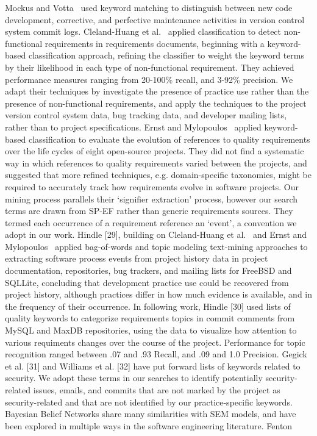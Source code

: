 Mockus and Votta~\cite{mockus2000identifying} used keyword matching to distinguish between new code development, corrective, and perfective maintenance activities in version control system commit logs.
Cleland-Huang et al.~\cite{clelandhuang2006detection} applied classification to detect non-functional requirements in requirements documents, beginning with a keyword-based classification approach, refining the classifier to weight the keyword terms by their likelihood in each type of non-functional requirement. They achieved performance measures ranging from 20-100\% recall, and 3-92\% precision. We adapt their techniques by investigate the presence of practice use rather than the presence of non-functional requirements, and apply the techniques to the project version control system data, bug tracking data, and developer mailing lists, rather than to project specifications.
Ernst and Mylopoulos~\cite{ernst10refsq} applied keyword-based classification to evaluate the evolution of references to quality requirements over the life cycles of eight open-source projects. They did not find a systematic way in which references to quality requirements varied between the projects, and suggested that more refined techniques, e.g. domain-specific taxonomies, might be required to accurately track how requirements evolve in software projects. Our mining process parallels their `signifier extraction' process, however our search terms are drawn from SP-EF rather than generic requirements sources. They termed each occurrence of a requirement reference an `event', a convention we adopt in our work.
Hindle [29], building on Cleland-Huang et al.~\cite{clelandhuang2006detection} and Ernst and Mylopoulos~\cite{ernst10refsq} applied bag-of-words and topic modeling text-mining approaches to extracting software process events from project history data in project documentation, repositories, bug trackers, and mailing lists for FreeBSD and SQLLite, concluding that development practice use could be recovered from project history, although practices differ in how much evidence is available, and in the frequency of their occurrence. In following work, Hindle [30] used lists of quality keywords to categorize requirements topics in commit comments from MySQL and MaxDB repositories, using the data to visualize how attention to various requiments changes over the course of the project. Performance for topic recognition ranged between .07 and .93 Recall, and .09 and 1.0 Precision. 
Gegick et al. [31] and Williams et al. [32] have put forward lists of keywords related to security. We adopt these terms in our searches to identify potentially security-related issues, emails, and commits that are not marked by the project as security-related and that are not identified by our practice-specific keywords.
Bayesian Belief Networks share many similarities with SEM models, and have been explored in multiple ways in the software engineering literature. Fenton 

